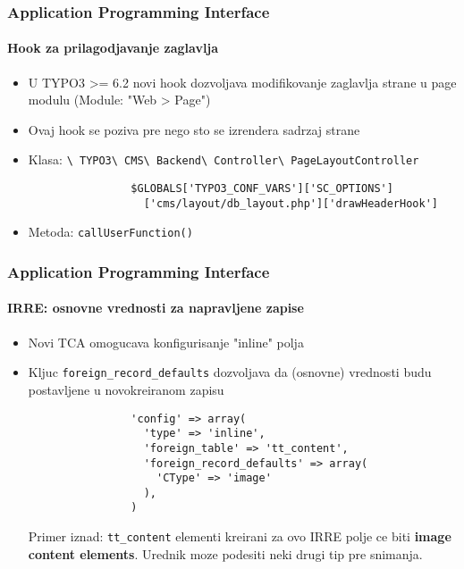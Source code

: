 \begin{frame}[fragile]
	\frametitle{Application Programming Interface}
	\framesubtitle{Hook za prilagodjavanje zaglavlja}

	\begin{itemize}
		\item U TYPO3 >= 6.2 novi hook dozvoljava modifikovanje zaglavlja strane u page modulu (Module: "Web > Page")
		\item Ovaj hook se poziva pre nego sto se izrendera sadrzaj strane
		\item Klasa:\newline
			\smaller
				\texttt{\textbackslash
					TYPO3\textbackslash
					CMS\textbackslash
					Backend\textbackslash
					Controller\textbackslash
					PageLayoutController}\normalsize

			\lstset{
				basicstyle=\smaller\ttfamily
			}

			\begin{lstlisting}
				$GLOBALS['TYPO3_CONF_VARS']['SC_OPTIONS']
				  ['cms/layout/db_layout.php']['drawHeaderHook']
			\end{lstlisting}

		\item Metoda:\newline
			\smaller
				\texttt{callUserFunction()}

	\end{itemize}

\end{frame}


\begin{frame}[fragile]
	\frametitle{Application Programming Interface}
	\framesubtitle{IRRE: osnovne vrednosti za napravljene zapise}

	\begin{itemize}
		\item Novi TCA omogucava konfigurisanje "inline" polja
		\item Kljuc \texttt{foreign\_record\_defaults} dozvoljava da (osnovne) vrednosti budu postavljene u novokreiranom zapisu

			\begin{lstlisting}
				'config' => array(
				  'type' => 'inline',
				  'foreign_table' => 'tt_content',
				  'foreign_record_defaults' => array(
				    'CType' => 'image'
				  ),
				)
			\end{lstlisting}

			\small
				Primer iznad: \texttt{tt\_content} elementi kreirani za ovo IRRE polje ce biti \textbf{image content elements}. Urednik moze podesiti neki drugi tip pre snimanja.
			\normalsize
	\end{itemize}

\end{frame}


